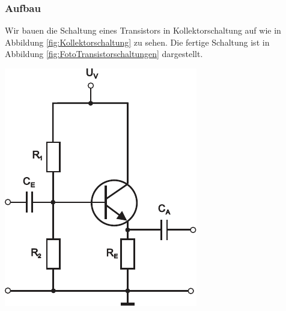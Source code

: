 \subsubsection*{Aufbau}
%
Wir bauen die Schaltung eines Transistors in Kollektorschaltung auf wie in Abbildung \ref{fig:Kollektorschaltung} zu sehen.
Die fertige Schaltung ist in Abbildung \ref{fig:FotoTransistorschaltungen} dargestellt.
%
\par
%
\minipage{\linewidth}
    \begin{center}
        \captionsetup{type=figure}
        \begin{adjustbox}{max width=\linewidth, keepaspectratio}
            \includegraphics[]{pdf/Kollektorschaltung}
        \end{adjustbox}
        \label{fig:Kollektorschaltung}
    \end{center}
\endminipage
%
